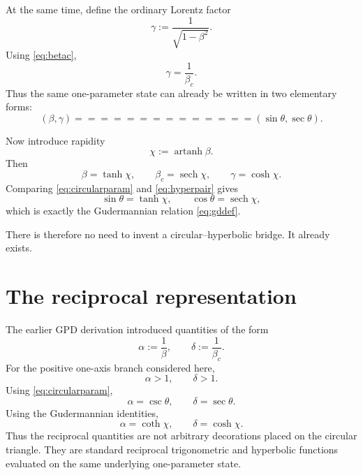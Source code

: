\documentclass[11pt]{article}
\DeclareMathOperator{\sech}{sech}
\DeclareMathOperator{\artanh}{artanh}
\begin{document}
At the same time, define the ordinary Lorentz factor
\begin{equation}
\gamma:=\frac{1}{\sqrt{1-\beta^2}}.
\label{eq:gamma}
\end{equation}
Using \eqref{eq:betac},
\begin{equation}
\gamma=\frac{1}{\beta_c}.
\label{eq:gammabetac}
\end{equation}
Thus the same one-parameter state can already be written in two elementary
forms:
\begin{equation}
(\beta,\gamma)
==============

(\sin\theta,\sec\theta).
\label{eq:circpair}
\end{equation}

Now introduce rapidity
\begin{equation}
\chi:=\artanh\beta.
\label{eq:chi}
\end{equation}
Then
\begin{equation}
\beta=\tanh\chi,
\qquad
\beta_c=\sech\chi,
\qquad
\gamma=\cosh\chi.
\label{eq:hyperpair}
\end{equation}
Comparing \eqref{eq:circularparam} and \eqref{eq:hyperpair} gives
\begin{equation}
\sin\theta=\tanh\chi,
\qquad
\cos\theta=\sech\chi,
\label{eq:bridge}
\end{equation}
which is exactly the Gudermannian relation \eqref{eq:gddef}.

There is therefore no need to invent a circular--hyperbolic bridge. It
already exists.

\section{The reciprocal representation}

The earlier GPD derivation introduced quantities of the form
\begin{equation}
\alpha:=\frac{1}{\beta},
\qquad
\delta:=\frac{1}{\beta_c}.
\label{eq:alphadelta}
\end{equation}
For the positive one-axis branch considered here,
\begin{equation}
\alpha>1,
\qquad
\delta>1.
\end{equation}
Using \eqref{eq:circularparam},
\begin{equation}
\alpha=\csc\theta,
\qquad
\delta=\sec\theta.
\label{eq:alphadeltacircular}
\end{equation}
Using the Gudermannian identities,
\begin{equation}
\alpha=\coth\chi,
\qquad
\delta=\cosh\chi.
\label{eq:alphadeltahyper}
\end{equation}
Thus the reciprocal quantities are not arbitrary decorations placed on the
circular triangle. They are standard reciprocal trigonometric and hyperbolic
functions evaluated on the same underlying one-parameter state.
\end{document}

